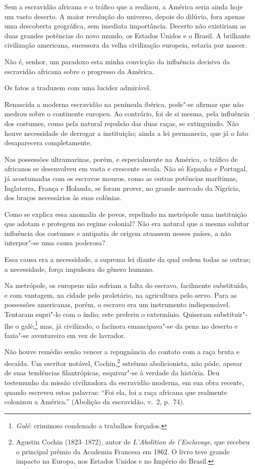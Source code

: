 Sem a escravidão africana e o tráfico que a realizou, a América seria
ainda hoje um vasto deserto. A maior revolução do universo, depois do
dilúvio, fora apenas uma descoberta geográfica, sem imediata
importância. Decerto não existiriam as duas grandes potências do novo
mundo, os Estados Unidos e o Brasil. A brilhante civilização americana,
sucessora da velha civilização europeia, estaria por nascer. 

\sectionitem

Não é, senhor, um paradoxo esta minha convicção da influência decisiva
da escravidão africana sobre o progresso da América.

Os fatos a traduzem com uma lucidez admirável.

Renascida a moderna escravidão na península ibérica, pode"-se afirmar
que não medrou sobre o continente europeu. Ao contrário, foi de si
mesma, pela influência dos costumes, como pela natural repulsão das
duas raças, se extinguindo. Não houve necessidade de derrogar a
instituição; ainda a lei permanecia, que já o fato desaparecera completamente. 

Nas possessões ultramarinas, porém, e especialmente na América, o
tráfico de africanos se desenvolveu em vasta e crescente escala. Não só
Espanha e Portugal, já acostumadas com os escravos mouros, como as
outras potências marítimas, Inglaterra, França e Holanda, se foram
prover, no grande mercado da Nigrícia, dos braços necessários às suas colônias. 

Como se explica essa anomalia de povos, repelindo na metrópole uma
instituição que adotam e protegem no regime colonial? Não era natural
que a mesma salutar influência dos costumes e antipatia de origem
atuassem nesses países, a não interpor"-se uma causa poderosa? 

Essa causa era a necessidade, a suprema lei diante da qual cedem todas
as outras; a necessidade, força impulsora do gênero humano.

Na metrópole, os europeus não sofriam a falta do escravo, facilmente
substituído, e com vantagem, na cidade pelo proletário, na agricultura
pelo servo. Para as possessões americanas, porém, o escravo era um
instrumento indispensável. Tentaram supri"-lo com o índio; este
preferiu o extermínio. Quiseram substituir"-lhe o
galé;\footnote{ \textit{Galé}: criminoso condenado a trabalhos forçados.} 
mas, já civilizado, o facínora emancipava"-se da pena no deserto e
fazia"-se aventureiro em vez de lavrador.

Não houve remédio senão vencer a repugnância do contato com a raça bruta
e decaída. Um escritor notável,
Cochin,\footnote{ Agustin Cochin (1823--1872), autor de \textit{L'Abolition de l'Esclavage}, 
que recebeu o principal prêmio da Academia Francesa em 1862. O livro teve grande 
impacto na Europa, nos Estados Unidos e no Império do Brasil.} 
estrênuo abolicionista, não pôde, apesar de suas tendências
filantrópicas, esquivar"-se à verdade da história. Deu testemunho da
missão civilizadora da escravidão moderna, em sua obra recente, quando
escreveu estas palavras: ``Foi ela, foi a raça africana que
realmente colonizou a América.'' (Abolição da escravidão, v.~2, p.~74).

